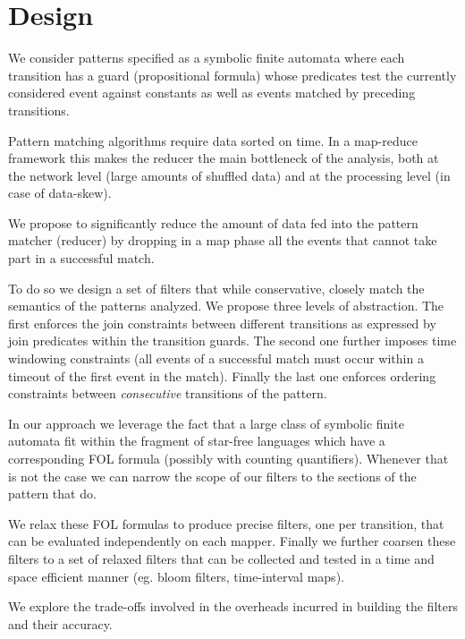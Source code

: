 \section{Design}

We consider patterns specified as a symbolic finite automata where each
transition has a guard (propositional formula) whose predicates test the
currently considered event against constants as well as events matched by
preceding transitions.
   
Pattern matching algorithms require data sorted on time.
In a map-reduce framework this makes the reducer the main bottleneck of the
analysis, both at the network level (large amounts of shuffled data) and at
the processing level (in case of data-skew).



We propose to significantly reduce the amount of data fed into the pattern
matcher (reducer) by dropping in a map phase all the events that cannot take
part in a successful match.

To do so we design a set of filters that while conservative, closely match the
semantics of the patterns analyzed.
We propose three levels of abstraction.
The first enforces the join constraints between different transitions as
expressed by join predicates within the transition guards.
The second one further imposes time windowing constraints (all events of a
successful match must occur within a timeout of the first event in the match).
Finally the last one enforces ordering constraints between {\em consecutive}
transitions of the pattern.

In our approach we leverage the fact that a large class of symbolic finite
automata fit within the fragment of star-free languages which
have a corresponding FOL formula (possibly with counting quantifiers).
Whenever that is not the case we can narrow the scope of our filters to the
sections of the pattern that do.
 
We relax these FOL formulas to produce precise filters, one per transition, 
that can be evaluated independently on each mapper.
Finally we further coarsen these filters to a set of relaxed filters
that can be collected and tested in a time and space efficient manner (eg. bloom
filters, time-interval maps).

We explore the trade-offs involved in the overheads incurred in building the
filters and their accuracy. 



